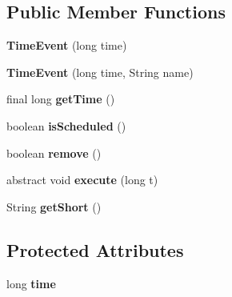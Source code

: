 \subsection*{Public Member Functions}
\begin{DoxyCompactItemize}
\item 
\hypertarget{classorg_1_1contikios_1_1cooja_1_1TimeEvent_ac94a97a97a1b979c1e0fd5488cf55ce8}{{\bfseries Time\-Event} (long time)}\label{classorg_1_1contikios_1_1cooja_1_1TimeEvent_ac94a97a97a1b979c1e0fd5488cf55ce8}

\item 
\hypertarget{classorg_1_1contikios_1_1cooja_1_1TimeEvent_a05a69143bc9566dd6cc516c4d0ad523b}{{\bfseries Time\-Event} (long time, String name)}\label{classorg_1_1contikios_1_1cooja_1_1TimeEvent_a05a69143bc9566dd6cc516c4d0ad523b}

\item 
\hypertarget{classorg_1_1contikios_1_1cooja_1_1TimeEvent_af4ea02d75ed7b85008d4a900eadd372b}{final long {\bfseries get\-Time} ()}\label{classorg_1_1contikios_1_1cooja_1_1TimeEvent_af4ea02d75ed7b85008d4a900eadd372b}

\item 
\hypertarget{classorg_1_1contikios_1_1cooja_1_1TimeEvent_a65fdda82f90f09e2bca14ff651c70d2f}{boolean {\bfseries is\-Scheduled} ()}\label{classorg_1_1contikios_1_1cooja_1_1TimeEvent_a65fdda82f90f09e2bca14ff651c70d2f}

\item 
\hypertarget{classorg_1_1contikios_1_1cooja_1_1TimeEvent_a4b66d6464ac9502afe9faefa7c83f1b1}{boolean {\bfseries remove} ()}\label{classorg_1_1contikios_1_1cooja_1_1TimeEvent_a4b66d6464ac9502afe9faefa7c83f1b1}

\item 
\hypertarget{classorg_1_1contikios_1_1cooja_1_1TimeEvent_a8818e9e93d5ae15c77a207535f47ebce}{abstract void {\bfseries execute} (long t)}\label{classorg_1_1contikios_1_1cooja_1_1TimeEvent_a8818e9e93d5ae15c77a207535f47ebce}

\item 
\hypertarget{classorg_1_1contikios_1_1cooja_1_1TimeEvent_af01fa994a7eef07dc1da46aa41bc4dc0}{String {\bfseries get\-Short} ()}\label{classorg_1_1contikios_1_1cooja_1_1TimeEvent_af01fa994a7eef07dc1da46aa41bc4dc0}

\end{DoxyCompactItemize}
\subsection*{Protected Attributes}
\begin{DoxyCompactItemize}
\item 
\hypertarget{classorg_1_1contikios_1_1cooja_1_1TimeEvent_a932d203ebb83d90339e2884d07c1824f}{long {\bfseries time}}\label{classorg_1_1contikios_1_1cooja_1_1TimeEvent_a932d203ebb83d90339e2884d07c1824f}

\end{DoxyCompactItemize}


